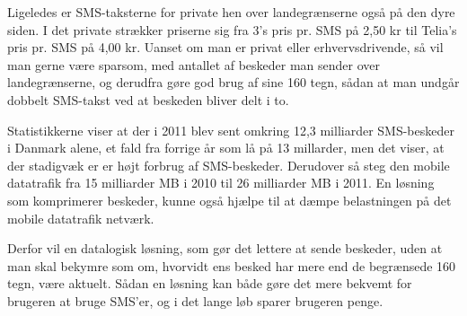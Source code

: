 Ligeledes er SMS-taksterne for private hen over landegrænserne også på den dyre siden. I det private strækker priserne sig fra 3's pris pr. SMS på 2,50 kr\cite{Pro_4} til Telia's pris pr. SMS på 4,00 kr\cite{Pro_5}. Uanset om man er privat eller erhvervsdrivende, så vil man gerne være sparsom, med antallet af beskeder man sender over landegrænserne, og derudfra gøre god brug af sine 160 tegn, sådan at man undgår dobbelt SMS-takst ved at beskeden bliver delt i to.

Statistikkerne viser at der i 2011 blev sent omkring 12,3 milliarder SMS-beskeder i Danmark alene, et fald fra forrige år som lå på 13 millarder, men det viser, at der stadigvæk er er højt forbrug af SMS-beskeder. Derudover så steg den mobile datatrafik fra 15 milliarder MB i 2010 til 26 milliarder MB i 2011\cite{Pro_6}. En løsning som komprimerer beskeder, kunne også hjælpe til at dæmpe belastningen på det mobile datatrafik netværk.

Derfor vil en  datalogisk løsning, som gør det lettere at sende beskeder, uden at man skal bekymre som om, hvorvidt ens besked har mere end de begrænsede 160 tegn, være aktuelt. Sådan en løsning kan både gøre det mere bekvemt for brugeren at bruge SMS'er, og i det lange løb sparer brugeren penge.